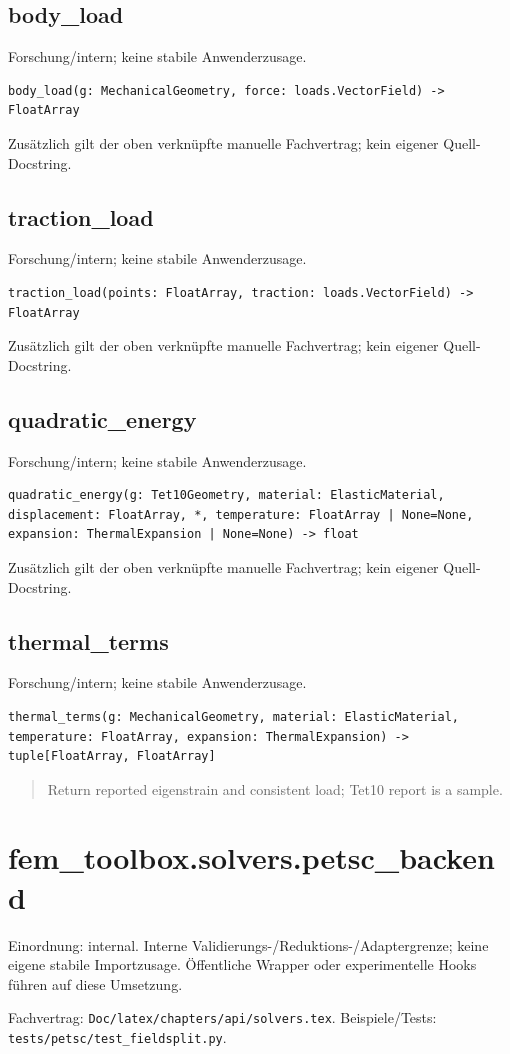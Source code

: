 \subsection{body\_load}
Forschung/intern; keine stabile Anwenderzusage.
\begin{lstlisting}
body_load(g: MechanicalGeometry, force: loads.VectorField) -> FloatArray
\end{lstlisting}
Zusätzlich gilt der oben verknüpfte manuelle Fachvertrag; kein eigener Quell-Docstring.
\subsection{traction\_load}
Forschung/intern; keine stabile Anwenderzusage.
\begin{lstlisting}
traction_load(points: FloatArray, traction: loads.VectorField) -> FloatArray
\end{lstlisting}
Zusätzlich gilt der oben verknüpfte manuelle Fachvertrag; kein eigener Quell-Docstring.
\subsection{quadratic\_energy}
Forschung/intern; keine stabile Anwenderzusage.
\begin{lstlisting}
quadratic_energy(g: Tet10Geometry, material: ElasticMaterial, displacement: FloatArray, *, temperature: FloatArray | None=None, expansion: ThermalExpansion | None=None) -> float
\end{lstlisting}
Zusätzlich gilt der oben verknüpfte manuelle Fachvertrag; kein eigener Quell-Docstring.
\subsection{thermal\_terms}
Forschung/intern; keine stabile Anwenderzusage.
\begin{lstlisting}
thermal_terms(g: MechanicalGeometry, material: ElasticMaterial, temperature: FloatArray, expansion: ThermalExpansion) -> tuple[FloatArray, FloatArray]
\end{lstlisting}
\begin{quote}
Return reported eigenstrain and consistent load; Tet10 report is a sample.
\end{quote}
\section{fem\_toolbox.solvers.petsc\_backend}
Einordnung: internal. Interne Validierungs-/Reduktions-/Adaptergrenze; keine eigene stabile Importzusage. Öffentliche Wrapper oder experimentelle Hooks führen auf diese Umsetzung.
\par Fachvertrag: \nolinkurl{Doc/latex/chapters/api/solvers.tex}. Beispiele/Tests:
\nolinkurl{tests/petsc/test_fieldsplit.py}.
